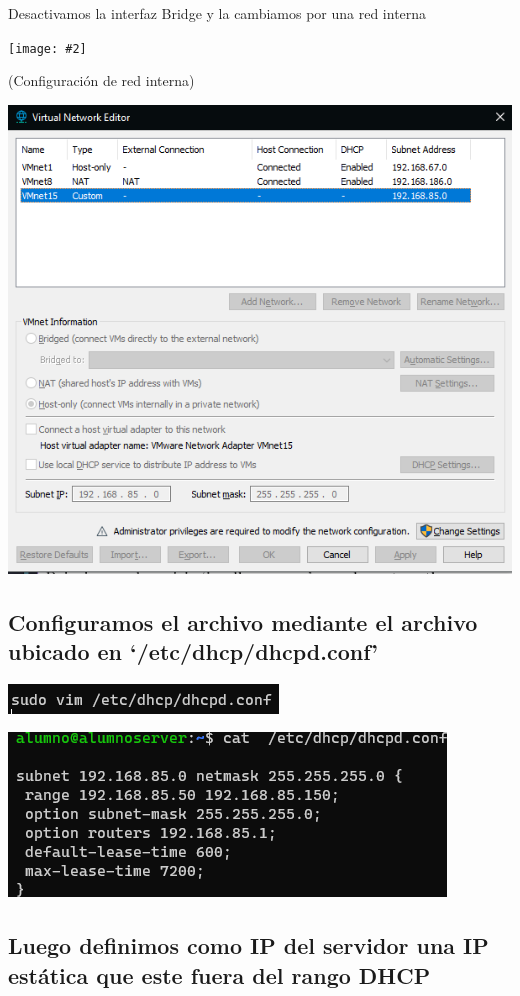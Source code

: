 \documentclass[a4paper,12pt]{article} %
\newcommand{\image}[2][1]{\texttt{[image: \#2]}}
\begin{document}
Desactivamos la interfaz Bridge y la cambiamos por una red interna

\image{04.png}

(Configuración de red interna)

\includegraphics{07.png}

\subsection{Configuramos el archivo mediante el archivo ubicado en `/etc/dhcp/dhcpd.conf'}

\includegraphics{06.png}

\includegraphics{05.png}



\subsection{Luego definimos como IP del servidor una IP estática que este fuera del rango DHCP}
\end{document}
